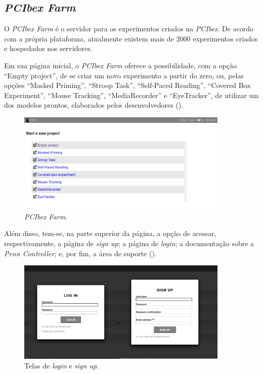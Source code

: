 \documentclass{textolivre}
\begin{document}
\subsection{\emph{PCIbex Farm}}
O \emph{PCIbex Farm} é o servidor para os experimentos criados na \emph{PCIbex}. De acordo com a própria plataforma, atualmente existem mais de 2000 experimentos criados e hospedados nos servidores.

Em sua página inicial, o \emph{PCIbex Farm} oferece a possibilidade, com a opção “Empty project”, de se criar um novo experimento a partir do zero, ou, pelas opções “Masked Priming”, “Stroop Task”, “Self-Paced Reading”, “Covered Box Experiment”, “Mouse Tracking”, “MediaRecorder” e “EyeTracker”, de utilizar um dos modelos prontos, elaborados pelos desenvolvedores ().

\begin{figure}[htbp]
 \centering
 \includegraphics[width=0.9\textwidth]{fig-003.png}
 \caption{\emph{PCIbex Farm}.}
 \label{fig3}
\end{figure}

Além disso, tem-se, na parte superior da página, a opção de acessar, respectivamente, a página de \emph{sign up}; a página de \emph{login}; a documentação sobre a \emph{Penn Controller}; e, por fim, a área de suporte ().

\begin{figure}[htbp]
 \centering
 \includegraphics[width=0.9\textwidth]{fig-004.png}
 \caption{Telas de \emph{login} e \emph{sign up}.}
 \label{fig4}
\end{figure}
\end{document}
